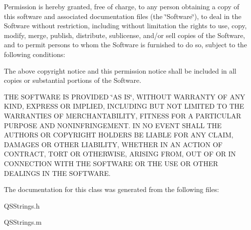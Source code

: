 \-Permission is hereby granted, free of charge, to any person obtaining a copy of this software and associated documentation files (the \char`\"{}\-Software\char`\"{}), to deal in the \-Software without restriction, including without limitation the rights to use, copy, modify, merge, publish, distribute, sublicense, and/or sell copies of the \-Software, and to permit persons to whom the \-Software is furnished to do so, subject to the following conditions\-:

\-The above copyright notice and this permission notice shall be included in all copies or substantial portions of the \-Software.

\-T\-H\-E \-S\-O\-F\-T\-W\-A\-R\-E \-I\-S \-P\-R\-O\-V\-I\-D\-E\-D \char`\"{}\-A\-S I\-S\char`\"{}, \-W\-I\-T\-H\-O\-U\-T \-W\-A\-R\-R\-A\-N\-T\-Y \-O\-F \-A\-N\-Y \-K\-I\-N\-D, \-E\-X\-P\-R\-E\-S\-S \-O\-R \-I\-M\-P\-L\-I\-E\-D, \-I\-N\-C\-L\-U\-D\-I\-N\-G \-B\-U\-T \-N\-O\-T \-L\-I\-M\-I\-T\-E\-D \-T\-O \-T\-H\-E \-W\-A\-R\-R\-A\-N\-T\-I\-E\-S \-O\-F \-M\-E\-R\-C\-H\-A\-N\-T\-A\-B\-I\-L\-I\-T\-Y, \-F\-I\-T\-N\-E\-S\-S \-F\-O\-R \-A \-P\-A\-R\-T\-I\-C\-U\-L\-A\-R \-P\-U\-R\-P\-O\-S\-E \-A\-N\-D \-N\-O\-N\-I\-N\-F\-R\-I\-N\-G\-E\-M\-E\-N\-T. \-I\-N \-N\-O \-E\-V\-E\-N\-T \-S\-H\-A\-L\-L \-T\-H\-E \-A\-U\-T\-H\-O\-R\-S \-O\-R \-C\-O\-P\-Y\-R\-I\-G\-H\-T \-H\-O\-L\-D\-E\-R\-S \-B\-E \-L\-I\-A\-B\-L\-E \-F\-O\-R \-A\-N\-Y \-C\-L\-A\-I\-M, \-D\-A\-M\-A\-G\-E\-S \-O\-R \-O\-T\-H\-E\-R \-L\-I\-A\-B\-I\-L\-I\-T\-Y, \-W\-H\-E\-T\-H\-E\-R \-I\-N \-A\-N \-A\-C\-T\-I\-O\-N \-O\-F \-C\-O\-N\-T\-R\-A\-C\-T, \-T\-O\-R\-T \-O\-R \-O\-T\-H\-E\-R\-W\-I\-S\-E, \-A\-R\-I\-S\-I\-N\-G \-F\-R\-O\-M, \-O\-U\-T \-O\-F \-O\-R \-I\-N \-C\-O\-N\-N\-E\-C\-T\-I\-O\-N \-W\-I\-T\-H \-T\-H\-E \-S\-O\-F\-T\-W\-A\-R\-E \-O\-R \-T\-H\-E \-U\-S\-E \-O\-R \-O\-T\-H\-E\-R \-D\-E\-A\-L\-I\-N\-G\-S \-I\-N \-T\-H\-E \-S\-O\-F\-T\-W\-A\-R\-E. 

\-The documentation for this class was generated from the following files\-:\begin{DoxyCompactItemize}
\item 
\-Q\-S\-Strings.\-h\item 
\-Q\-S\-Strings.\-m\end{DoxyCompactItemize}
